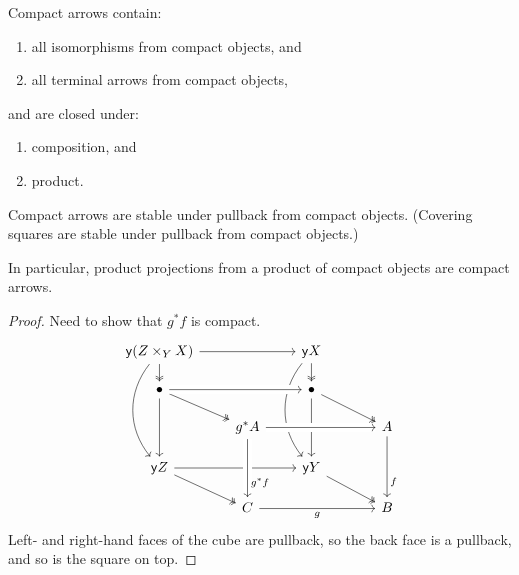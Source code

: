 \documentclass[a4paper,11pt]{amsart}
\begin{document}
\begin{lem}\label{lem:compact-closure}
	Compact arrows contain:
	\begin{enumerate}
	\item
	all isomorphisms from compact objects, and
	\item
	all terminal arrows from compact objects,
	\end{enumerate}
	and are closed under:
	\begin{enumerate}[resume]
	\item
	composition, and
	\item
	product.
	\end{enumerate}
\end{lem}

\begin{lem}\label{lem:compact-pb}
	Compact arrows are stable under pullback from compact objects.
	(Covering squares are stable under pullback from compact objects.)
	
	In particular, product projections from a product of compact objects are compact arrows.
\end{lem}

\begin{proof}
	Need to show that $g^*f$ is compact.
	\[\begin{tikzcd}[column sep=5ex, row sep=3ex]
		\yo(Z\times_YX)	\ar[ddd,bend right=9ex] \ar[d,two heads] \ar[rr]
		&&	\yo X \ar[ddd,bend right=9ex] \ar[d,two heads]
		&[3ex]\\
		\bullet	\ar[dd] \ar[dr,two heads] \ar[rr,crossing over]	&&	\bullet	\ar[dd] \ar[dr,two heads]
		&\\
		&	g^*A	\ar[rr,crossing over]	&&	A	\ar[dd,"f"{near end}]
		\\
		\yo Z	\ar[dr, two heads] \ar[rr]	&&	\yo Y	\ar[dr, two heads]
		&\\
		&	C	\ar[from=uu,"g^*f"{near end},crossing over] \ar[rr,"g"']	&&	B
	\end{tikzcd}\]
	Left- and right-hand faces of the cube are pullback, so the back face is a pullback, and so is the square on top.
\end{proof}
\end{document}
